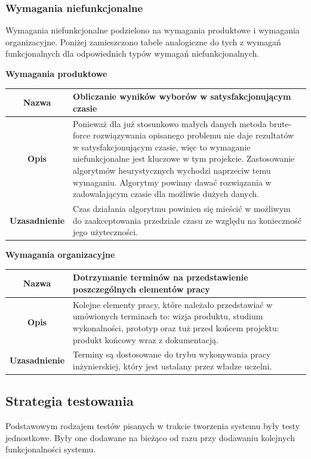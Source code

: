 \documentclass[polish,11pt]{aghthesis}
\begin{document}
\subsubsection{Wymagania niefunkcjonalne}
Wymagania niefunkcjonalne podzielono na wymagania produktowe i wymagania organizacyjne. Poniżej zamieszczono tabele analogiczne do tych z wymagań funkcjonalnych dla odpowiednich typów wymagań niefunkcjonalnych.
\clearpage
\begin{center}
\textbf{Wymagania produktowe}
\end{center}
{
\centering
\begin{tabular}{|c|p{10cm}|}
\hline
\textbf{Nazwa} & Obliczanie wyników wyborów w satysfakcjonującym czasie \\ 
\hline 
\textbf{Opis} & Ponieważ dla już stosunkowo małych danych metoda brute-force
rozwiązywania opisanego problemu nie daje rezultatów w
satysfakcjonującym czasie, więc to wymaganie niefunkcjonalne jest
kluczowe w tym projekcie. Zastosowanie algorytmów heurystycznych
wychodzi naprzeciw temu wymaganiu. Algorytmy powinny dawać
rozwiązania w zadowalającym czasie dla możliwie dużych danych. \\ 
\hline 
\textbf{Uzasadnienie} & Czas działania algorytmu powinien się mieścić w możliwym do
zaakceptowania przedziale czasu ze względu na konieczność jego
użyteczności.\\ 
\hline 
\end{tabular}
}

\begin{center}
\textbf{Wymagania organizacyjne}
\end{center}
{
\centering
\begin{tabular}{|c|p{10cm}|}
\hline
\textbf{Nazwa} & Dotrzymanie terminów na przedstawienie poszczególnych elementów
pracy \\ 
\hline 
\textbf{Opis} & Kolejne elementy pracy, które należało przedstawiać w umówionych
terminach to: wizja produktu, studium wykonalności, prototyp oraz tuż
przed końcem projektu: produkt końcowy wraz z dokumentacją. \\ 
\hline 
\textbf{Uzasadnienie} & Terminy są dostosowane do trybu wykonywania pracy inżynierskiej,
który jest ustalany przez władze uczelni.\\ 
\hline 
\end{tabular}
}

\subsection{Strategia testowania}
Podstawowym rodzajem testów pisanych w trakcie tworzenia systemu były testy
jednostkowe. Były one dodawane na bieżąco od razu przy dodawaniu kolejnych
funkcjonalności systemu. 
\end{document}

